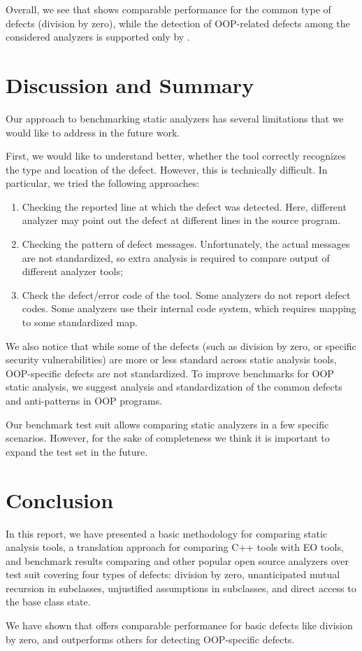Overall, we see that \polystat{} shows comparable performance for the common type of defects (division by zero), while the detection of OOP-related defects among the considered analyzers is supported only by \polystat{}.

\section{Discussion and Summary}

Our approach to benchmarking static analyzers has several limitations that we would like to address in the future work.

First, we would like to understand better, whether the tool correctly recognizes the type and location of the defect. However, this is technically difficult. In particular, we tried the following approaches:
\begin{enumerate}
    \item Checking the reported line at which the defect was detected. Here, different analyzer may point out the defect at different lines in the source program.
    \item Checking the pattern of defect messages. Unfortunately, the actual messages are not standardized, so extra analysis is required to  compare output of different analyzer tools;
    \item Check the defect/error code of the tool. Some analyzers do not report defect codes. Some analyzers use their internal code system, which requires mapping to some standardized map.
\end{enumerate}

We also notice that while some of the defects (such as division by zero, or specific security vulnerabilities) are more or less standard across static analysis tools, OOP-specific defects are not standardized. To improve benchmarks for OOP static analysis, we suggest analysis and standardization of the common defects and anti-patterns in OOP programs.

Our benchmark test suit allows comparing static analyzers in a few specific scenarios. However, for the sake of completeness we think it is important to expand the test set in the future.

\section{Conclusion}

In this report, we have presented a basic methodology for comparing static analysis tools, a translation approach for comparing C++ tools with EO tools, and benchmark results comparing \polystat{} and other popular open source analyzers over test suit covering four types of defects: division by zero, unanticipated mutual recursion in subclasses, unjustified assumptions in subclasses, and direct access to the base class state.

We have shown that \polystat{} offers comparable performance for basic defects like division by zero, and outperforms others for detecting OOP-specific defects.

\printbibliography

\onecolumn
\appendix
